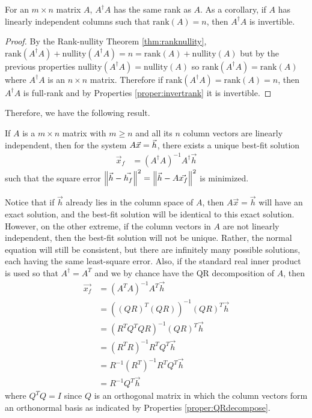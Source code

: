 \begin{proper}
\label{proper:AdagArank}
For an $m \times n$ matrix $A$, $A^\dag A$ has the same rank as $A$. As a corollary, if $A$ has linearly independent columns such that $\text{rank}(A) = n$, then $A^\dag A$ is invertible.
\end{proper}
\begin{proof}
By the Rank-nullity Theorem \ref{thm:ranknullity}, $\text{rank}(A^\dag A) + \text{nullity}(A^\dag A) = n = \text{rank}(A) + \text{nullity}(A)$ but by the previous properties $\text{nullity}(A^\dag A) = \text{nullity}(A)$ so $\text{rank}(A^\dag A) = \text{rank}(A)$ where $A^\dag A$ is an $n \times n$ matrix. Therefore if $\text{rank}(A^\dag A) = \text{rank}(A) = n$, then $A^\dag A$ is full-rank and by Properties \ref{proper:invertrank} it is invertible.
\end{proof}
Therefore, we have the following result.
\begin{thm}
\label{thm:bestfit}
If $A$ is a $m \times n$ matrix with $m \geq n$ and all its $n$ column vectors are linearly independent, then for the system $A\vec{x} = \smash{\vec{h}}$, there exists a unique best-fit solution
\begin{align}
\vec{x}_f &= (A^\dag A)^{-1}A^\dag \vec{h} \label{eqn:bestfit}
\end{align}
such that the square error $\norm{\vec{h}-\vec{h_f}}^2 = \norm{\vec{h}-A\vec{x_f}}^2$ is minimized.
\end{thm}
Notice that if $\vec{h}$ already lies in the column space of $A$, then $A\vec{x} = \vec{h}$ will have an exact solution, and the best-fit solution will be identical to this exact solution. However, on the other extreme, if the column vectors in $A$ are not linearly independent, then the best-fit solution will not be unique. Rather, the normal equation will still be consistent, but there are infinitely many possible solutions, each having the same least-square error. Also, if the standard real inner product is used so that $A^\dag = A^T$ and we by chance have the QR decomposition of $A$, then
\begin{align}
\vec{x_f} &= (A^TA)^{-1}A^T\vec{h} \nonumber \\
&= ((QR)^T(QR))^{-1}(QR)^T\vec{h} \nonumber \\
&= (R^TQ^TQR)^{-1} (QR)^T\vec{h} \nonumber \\
&= (R^TR)^{-1} R^TQ^T \vec{h} \nonumber \\
&= R^{-1} (R^T)^{-1} R^TQ^T \vec{h} \nonumber \\
&= R^{-1} Q^T\vec{h}
\end{align}
where $Q^TQ = I$ since $Q$ is an orthogonal matrix in which the column vectors form an orthonormal basis as indicated by Properties \ref{proper:QRdecompose}.

